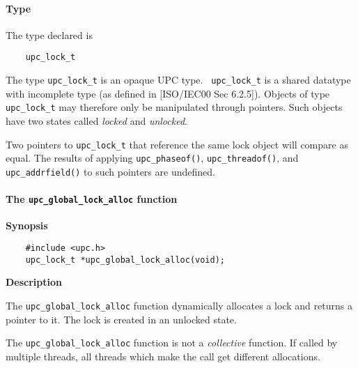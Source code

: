 \paragraph{Type}

\npf The type declared is 

\begin{verbatim}
    upc_lock_t 
\end{verbatim}

\np The type {\tt upc\_lock\_t} is an opaque UPC type. {\tt
    upc\_lock\_t} is a shared datatype with incomplete type (as
    defined in [ISO/IEC00 Sec 6.2.5]).  Objects of type {\tt
    upc\_lock\_t} may therefore only be manipulated through pointers.
    Such objects have two states called {\em locked} and {\em unlocked}.

\np Two pointers to {\tt upc\_lock\_t} that reference the same lock object will
    compare as equal.  The results of applying {\tt upc\_phaseof()},
     {\tt upc\_threadof()}, and {\tt upc\_addrfield()} to such pointers
     are undefined.

\np {}

\paragraph{The {\tt upc\_global\_lock\_alloc} function}

{\bf Synopsis} 

\npf\vspace{-2.5em}
\begin{verbatim}
    #include <upc.h> 
    upc_lock_t *upc_global_lock_alloc(void); 
\end{verbatim}

{\bf Description}

\np The {\tt upc\_global\_lock\_alloc} function dynamically
    allocates a lock and returns a pointer to it.  The lock is created
    in an unlocked state.

\np The {\tt upc\_global\_lock\_alloc} function is not a {\em
    collective} function. If called by multiple threads,
    all threads which make the call get different allocations.
    

